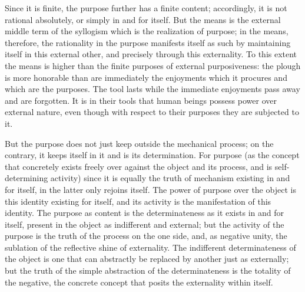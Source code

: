 Since it is finite, the purpose further
has a finite content;
accordingly, it is not rational absolutely,
or simply in and for itself.
But the means is the external
middle term of the syllogism
which is the realization of purpose;
in the means, therefore, the rationality
in the purpose manifests itself as such
by maintaining itself in this external other,
and precisely through this externality.
To this extent the means is higher than
the finite purposes of external purposiveness:
the plough is more honorable than are immediately
the enjoyments which it procures
and which are the purposes.
The tool lasts while the immediate enjoyments
pass away and are forgotten.
It is in their tools that human beings
possess power over external nature,
even though with respect to their purposes
they are subjected to it.

But the purpose does not just keep
outside the mechanical process;
on the contrary, it keeps itself in it
and is its determination.
For purpose
(as the concept that concretely exists
freely over against the object and its process,
and is self-determining activity)
since it is equally the truth of
mechanism existing in and for itself,
in the latter only rejoins itself.
The power of purpose over the object is
this identity existing for itself,
and its activity is the manifestation of this identity.
The purpose as content is the determinateness as
it exists in and for itself,
present in the object as indifferent and external;
but the activity of the purpose is
the truth of the process on the one side,
and, as negative unity, the sublation of
the reflective shine of externality.
The indifferent determinateness of the object is
one that can abstractly be replaced
by another just as externally;
but the truth of the simple
abstraction of the determinateness is
the totality of the negative,
the concrete concept that posits
the externality within itself.

